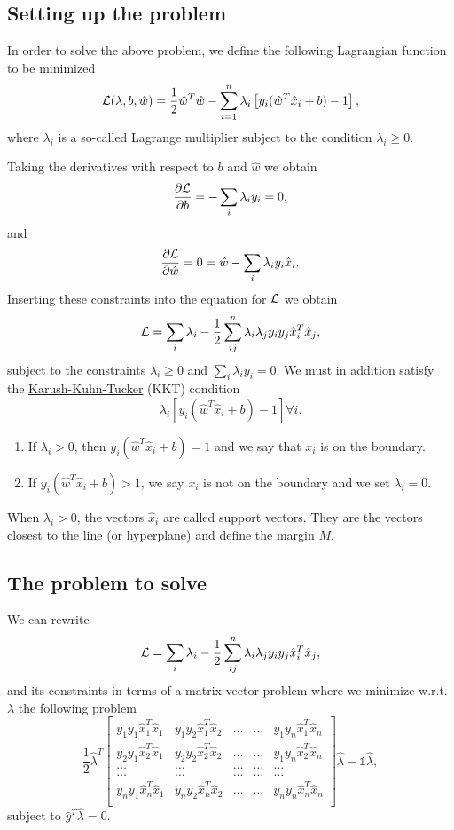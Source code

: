 \documentclass[%
oneside,                 %
final,                   %
10pt]{article}
\begin{document}
\subsection*{Setting up the problem}
In order to solve the above problem, we define the following Lagrangian function to be minimized 
\[
{\cal L}(\lambda,b,\hat{w})=\frac{1}{2}\hat{w}^T\hat{w}-\sum_{i=1}^n\lambda_i\left[y_i(\hat{w}^T\hat{x}_i+b)-1\right],
\]
where $\lambda_i$ is a so-called Lagrange multiplier subject to the condition $\lambda_i \geq 0$.

Taking the derivatives  with respect to $b$ and $\hat{w}$ we obtain 
\[
\frac{\partial {\cal L}}{\partial b} = -\sum_{i} \lambda_iy_i=0,
\]
and 
\[
\frac{\partial {\cal L}}{\partial \hat{w}} = 0 = \hat{w}-\sum_{i} \lambda_iy_i\hat{x}_i.
\]
Inserting these constraints into the equation for ${\cal L}$ we obtain
\[
{\cal L}=\sum_i\lambda_i-\frac{1}{2}\sum_{ij}^n\lambda_i\lambda_jy_iy_j\hat{x}_i^T\hat{x}_j,
\]
subject to the constraints $\lambda_i\geq 0$ and $\sum_i\lambda_iy_i=0$. 
We must in addition satisfy the \href{{https://en.wikipedia.org/wiki/Karush%
\[
\lambda_i\left[y_i(\hat{w}^T\hat{x}_i+b) -1\right] \forall i.
\]
\begin{enumerate}
\item If $\lambda_i > 0$, then $y_i(\hat{w}^T\hat{x}_i+b)=1$ and we say that $x_i$ is on the boundary.

\item If $y_i(\hat{w}^T\hat{x}_i+b)> 1$, we say $x_i$ is not on the boundary and we set $\lambda_i=0$. 
\end{enumerate}

\noindent
When $\lambda_i > 0$, the vectors $\hat{x}_i$ are called support vectors. They are the vectors closest to the line (or hyperplane) and define the margin $M$. 

\subsection*{The problem to solve}

We can rewrite 
\[
{\cal L}=\sum_i\lambda_i-\frac{1}{2}\sum_{ij}^n\lambda_i\lambda_jy_iy_j\hat{x}_i^T\hat{x}_j,
\]
and its constraints in terms of a matrix-vector problem where we minimize w.r.t. $\lambda$ the following problem
\[
\frac{1}{2} \hat{\lambda}^T\begin{bmatrix} y_1y_1\hat{x}_1^T\hat{x}_1 & y_1y_2\hat{x}_1^T\hat{x}_2 & \dots & \dots & y_1y_n\hat{x}_1^T\hat{x}_n \\
y_2y_1\hat{x}_2^T\hat{x}_1 & y_2y_2\hat{x}_2^T\hat{x}_2 & \dots & \dots & y_1y_n\hat{x}_2^T\hat{x}_n \\
\dots & \dots & \dots & \dots & \dots \\
\dots & \dots & \dots & \dots & \dots \\
y_ny_1\hat{x}_n^T\hat{x}_1 & y_ny_2\hat{x}_n^T\hat{x}_2 & \dots & \dots & y_ny_n\hat{x}_n^T\hat{x}_n \\
\end{bmatrix}\hat{\lambda}-\mathbb{1}\hat{\lambda}, 
\]
subject to $\hat{y}^T\hat{\lambda}=0$. 
\end{document}
